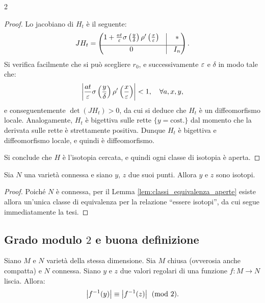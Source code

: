 \begin{multicols*}{2}
\begin{proof}
        Lo jacobiano di $H_t$ è il seguente:
        \[
            J H_t = \begin{pmatrix}
                1 + \frac{a t}{\varepsilon} \sigma\left(\frac{y}{\delta}\right) \rho'\left(\frac{x}{\varepsilon}\right) & \vline & *   \\[0.06in]
                \hline
                0                                                                                                       & \vline & I_n
            \end{pmatrix}.
        \]
        Si verifica facilmente che si può scegliere $r_0$, e successivamente $\varepsilon$ e $\delta$ in modo tale che:
        \[
            \left\lvert \frac{a t}{\varepsilon} \sigma\left(\frac{y}{\delta}\right) \rho'\left(\frac{x}{\varepsilon}\right) \right\rvert < 1, \quad \forall a, x, y,
        \]
        e conseguentemente $\det(J H_t) > 0$, da cui si deduce che $H_t$ è un diffeomorfismo locale. Analogamente, $H_t$ è
        bigettiva sulle rette $\{y = \text{cost.}\}$ dal momento che la derivata sulle rette è strettamente
        positiva. Dunque $H_t$ è bigettiva e diffeomorfismo locale, e quindi è diffeomorfismo. \smallskip

        Si conclude che $H$ è l'isotopia cercata, e quindi ogni classe di isotopia è aperta.
    \end{proof}

    \begin{lemma}[di omogeneità] \label{lem:omogeneità}
        Sia $N$ una varietà connessa e siano $y$, $z$ due suoi punti. Allora
        $y$ e $z$ sono isotopi.
    \end{lemma}

    \begin{proof}
        Poiché $N$ è connessa, per il Lemma \ref{lem:classi_equivalenza_aperte} esiste
        allora un'unica classe di equivalenza per la relazione ``essere isotopi'', da
        cui segue immediatamente la tesi.
    \end{proof}

    \subsection{Grado modulo \texorpdfstring{$2$}{2} e buona definizione}

    \begin{theorem}
        Siano $M$ e $N$ varietà della stessa dimensione. Sia $M$ chiusa (ovverosia
        anche compatta) e $N$ connessa. Siano $y$ e $z$ due valori regolari di una
        funzione $f : M \to N$ liscia. Allora:
        \[ \left\lvert f^{-1}(y) \right\rvert \equiv \left\lvert f^{-1}(z) \right\rvert \pmod{2}. \]
    \end{theorem}


\end{multicols*}
